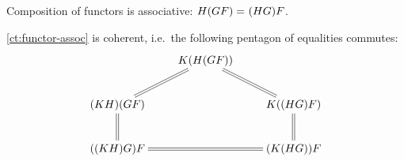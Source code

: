 \documentclass[hott-all.tex]{subfiles}
\begin{document}

\begin{lem}
  Composition of functors is associative: $H(GF) =_{} (HG)F$.
\end{lem}
%

\begin{lem}
  \cref{ct:functor-assoc} is coherent, i.e.\ the following pentagon of equalities commutes:
  \[ \xymatrix{ & K(H(GF)) \ar@{=}[dl] \ar@{=}[dr]\\
    (KH)(GF) \ar@{=}[d] && K((HG)F) \ar@{=}[d]\\
    ((KH)G)F && (K(HG))F \ar@{=}[ll] }
  \]
\end{lem}

\end{document}
